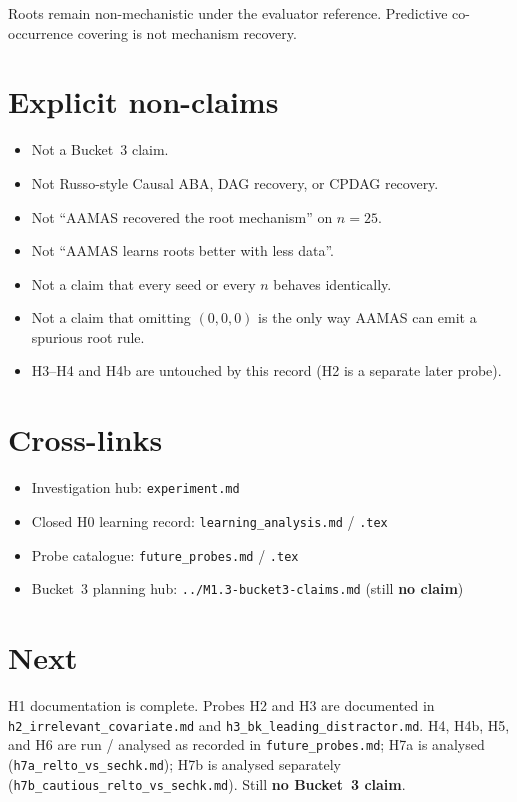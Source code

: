 \documentclass[11pt]{article}
\begin{document}
Roots remain non-mechanistic under the evaluator reference.
Predictive co-occurrence covering is not mechanism recovery.

\section{Explicit non-claims}

\begin{itemize}
  \item Not a Bucket~3 claim.
  \item Not Russo-style Causal ABA, DAG recovery, or CPDAG recovery.
  \item Not ``AAMAS recovered the root mechanism'' on \(n{=}25\).
  \item Not ``AAMAS learns roots better with less data''.
  \item Not a claim that every seed or every \(n\) behaves identically.
  \item Not a claim that omitting \((0,0,0)\) is the only way AAMAS can emit a
    spurious root rule.
  \item H3--H4 and H4b are untouched by this record (H2 is a separate later probe).
\end{itemize}

\section{Cross-links}

\begin{itemize}
  \item Investigation hub: \texttt{experiment.md}
  \item Closed H0 learning record: \texttt{learning\_analysis.md} / \texttt{.tex}
  \item Probe catalogue: \texttt{future\_probes.md} / \texttt{.tex}
  \item Bucket~3 planning hub: \texttt{../M1.3-bucket3-claims.md}
    (still \textbf{no claim})
\end{itemize}

\section{Next}

H1 documentation is complete.
Probes H2 and H3 are documented in \texttt{h2\_irrelevant\_covariate.md} and
\texttt{h3\_bk\_leading\_distractor.md}.
H4, H4b, H5, and H6 are run / analysed as recorded in
\texttt{future\_probes.md}; H7a is analysed
(\texttt{h7a\_relto\_vs\_sechk.md}); H7b is analysed separately
(\texttt{h7b\_cautious\_relto\_vs\_sechk.md}).
Still \textbf{no Bucket~3 claim}.
\end{document}
